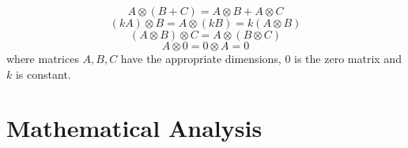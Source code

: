     \begin{equation*}
            A \otimes (B + C) = A \otimes B + A \otimes C
    \end{equation*}
    \begin{equation*}
        (kA) \otimes B = A \otimes (kB) = k(A \otimes B)
    \end{equation*}
    \begin{equation*}
        (A \otimes B) \otimes C = A \otimes (B \otimes C)
    \end{equation*}
    \begin{equation*}
         A \otimes 0 = 0 \otimes A = 0
    \end{equation*}
    where matrices $A,B,C$ have the appropriate dimensions, $0$ is the zero matrix and $k$ is constant.
    

\section{Mathematical Analysis}
    
